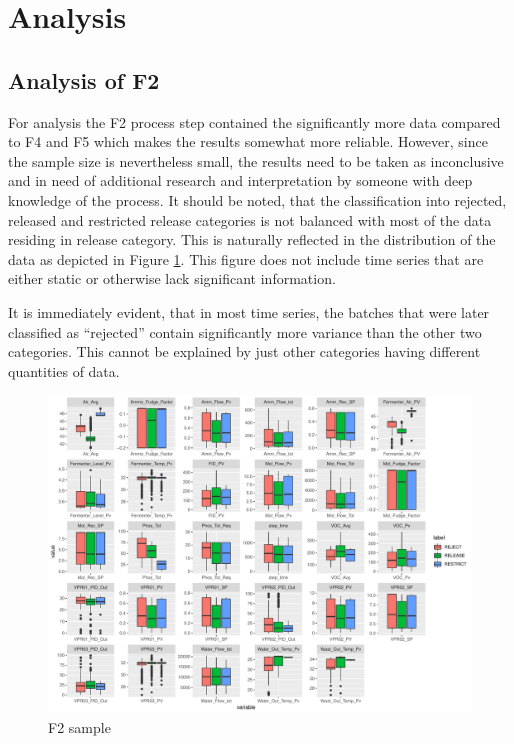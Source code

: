 \section{Analysis}

\subsection{Analysis of F2}
For analysis the F2 process step contained the significantly more data compared to F4 and F5 which makes the results somewhat more reliable. However, since the sample size is nevertheless small, the results need to be taken as inconclusive and in need of additional research and interpretation by someone with deep knowledge of the process. It should be noted, that the classification into rejected, released and restricted release categories is not balanced with most of the data residing in release category. This is naturally reflected in the distribution of the data as depicted in Figure \ref{fig:f2_sample}. This figure does not include time series that are either static or otherwise lack significant information. 

It is immediately evident, that in most time series, the batches that were later classified as ``rejected'' contain significantly more variance than the other two categories. This cannot be explained by just other categories having different quantities of data.

\begin{figure}[ht]
    \centering
    \includegraphics[width=1.0\textwidth]{plots/f2-sample.pdf}
    \caption{F2 sample}
    \label{fig:f2_sample}
\end{figure}


